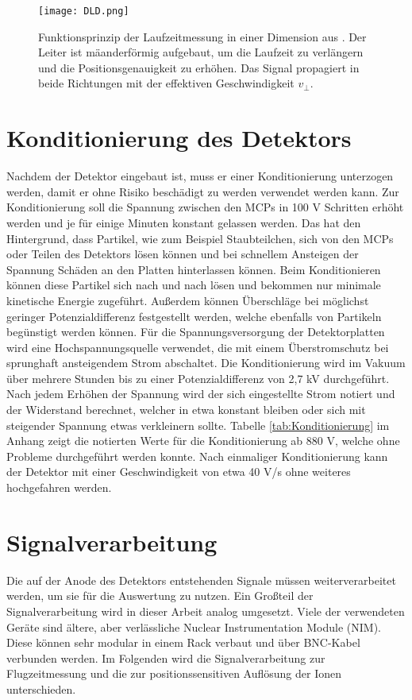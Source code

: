 \begin{figure}
    \centering
    \texttt{[image: DLD.png]}
    \caption[Funktionsprinzip der Laufzeitmessung des Detektors]{Funktionsprinzip der Laufzeitmessung in einer Dimension aus \cite{Detektorsystem}. Der Leiter ist mäanderförmig aufgebaut, um die Laufzeit zu verlängern und die Positionsgenauigkeit zu erhöhen. Das Signal propagiert in beide Richtungen mit der effektiven Geschwindigkeit $v_\perp$.}
    \label{fig:DLD} 
\end{figure}

\section{Konditionierung des Detektors}
Nachdem der Detektor eingebaut ist, muss er einer Konditionierung unterzogen werden, damit er ohne Risiko beschädigt zu werden verwendet werden kann. Zur Konditionierung soll die Spannung zwischen den MCPs in 100 V Schritten erhöht werden und je für einige Minuten konstant gelassen werden. Das hat den Hintergrund, dass Partikel, wie zum Beispiel Staubteilchen, sich von den MCPs oder Teilen des Detektors lösen können und bei schnellem Ansteigen der Spannung Schäden an den Platten hinterlassen können. Beim Konditionieren können diese Partikel sich nach und nach lösen und bekommen nur minimale kinetische Energie zugeführt. Außerdem können Überschläge bei möglichst geringer Potenzialdifferenz festgestellt werden, welche ebenfalls von Partikeln begünstigt werden können. Für die Spannungsversorgung der Detektorplatten wird eine Hochspannungsquelle verwendet, die mit einem Überstromschutz bei sprunghaft ansteigendem Strom abschaltet. Die Konditionierung wird im Vakuum über mehrere Stunden bis zu einer Potenzialdifferenz von 2,7 kV durchgeführt. Nach jedem Erhöhen der Spannung wird der sich eingestellte Strom notiert und der Widerstand berechnet, welcher in etwa konstant bleiben oder sich mit steigender Spannung etwas verkleinern sollte. Tabelle \ref{tab:Konditionierung} im Anhang zeigt die notierten Werte für die Konditionierung ab 880 V, welche ohne Probleme durchgeführt werden konnte. Nach einmaliger Konditionierung kann der Detektor mit einer Geschwindigkeit von etwa 40 V/s ohne weiteres hochgefahren werden.

\section{Signalverarbeitung}
Die auf der Anode des Detektors entstehenden Signale müssen weiterverarbeitet werden, um sie für die Auswertung zu nutzen. Ein Großteil der Signalverarbeitung wird in dieser Arbeit analog umgesetzt. Viele der verwendeten Geräte sind ältere, aber verlässliche Nuclear Instrumentation Module (NIM). Diese können sehr modular in einem Rack verbaut und über BNC-Kabel verbunden werden. Im Folgenden wird die Signalverarbeitung zur Flugzeitmessung und die zur positionssensitiven Auflösung der Ionen unterschieden.

